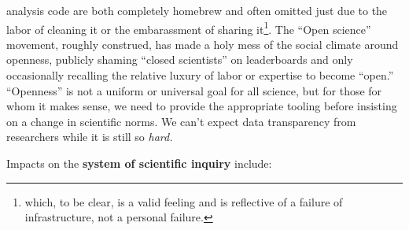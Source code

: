\documentclass[11pt]{article}
\begin{document}
\begin{multicols}{2}
\begin{itemize}
  analysis code are both completely homebrew and often omitted just due
  to the labor of cleaning it or the embarassment of sharing
  it\footnote{which, to be clear, is a valid feeling and is reflective
    of a failure of infrastructure, not a personal failure.}. The ``Open
  science'' movement, roughly construed, has made a holy mess of the
  social climate around openness, publicly shaming ``closed scientists''
  on leaderboards and only occasionally recalling the relative luxury of
  labor or expertise to become ``open.'' ``Openness'' is not a uniform
  or universal goal for all science, but for those for whom it makes
  sense, we need to provide the appropriate tooling before insisting on
  a change in scientific norms. We can't expect data transparency from
  researchers while it is still so \emph{hard.}
\end{itemize}

Impacts on the \textbf{system of scientific inquiry} include:

\begin{itemize}


\end{itemize}
\end{multicols}
\end{document}
